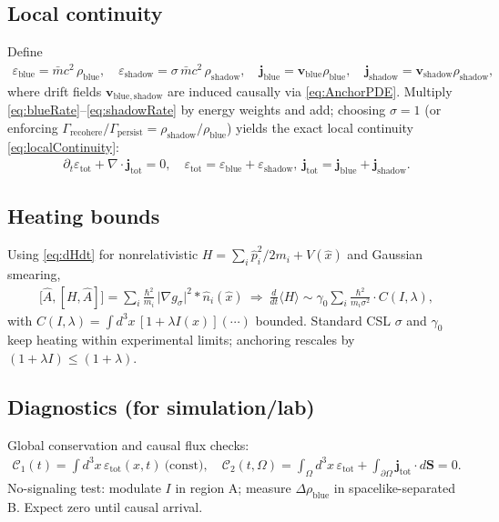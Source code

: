 \documentclass[11pt]{article}
\newcommand{\braket}[1]{\langle #1 \rangle}
\begin{document}
\subsection{Local continuity}
Define
\begin{align}
\varepsilon_{\mathrm{blue}}=\bar m c^2\,\rho_{\mathrm{blue}},\quad \varepsilon_{\mathrm{shadow}}=\sigma\,\bar m c^2\,\rho_{\mathrm{shadow}},\quad
\mathbf j_{\mathrm{blue}}=\mathbf v_{\mathrm{blue}}\rho_{\mathrm{blue}},\quad \mathbf j_{\mathrm{shadow}}=\mathbf v_{\mathrm{shadow}}\rho_{\mathrm{shadow}},
\end{align}
where drift fields $\mathbf v_{\mathrm{blue,shadow}}$ are induced causally via \eqref{eq:AnchorPDE}. Multiply \eqref{eq:blueRate}--\eqref{eq:shadowRate} by energy weights and add; choosing $\sigma=1$ (or enforcing $\Gamma_{\mathrm{recohere}}/\Gamma_{\mathrm{persist}}=\rho_{\mathrm{shadow}}/\rho_{\mathrm{blue}}$) yields the exact local continuity \eqref{eq:localContinuity}:
\begin{align}
\partial_t\varepsilon_{\mathrm{tot}}+\nabla\cdot\mathbf j_{\mathrm{tot}}=0,\quad
\varepsilon_{\mathrm{tot}}=\varepsilon_{\mathrm{blue}}+\varepsilon_{\mathrm{shadow}},\ \mathbf j_{\mathrm{tot}}=\mathbf j_{\mathrm{blue}}+\mathbf j_{\mathrm{shadow}}.\label{eq:ContFinal}
\end{align}

\subsection{Heating bounds}
Using \eqref{eq:dHdt} for nonrelativistic $H=\sum_i \hat p_i^2/2m_i+V(\hat x)$ and Gaussian smearing,
\begin{align}
\big[\hat A,[H,\hat A]\big]=\sum_i\frac{\hbar^2}{m_i}\,\big|\nabla g_\sigma\big|^2 * \hat n_i(\hat x)\ \Rightarrow\
\frac{d}{dt}\braket{H}\sim \gamma_0\sum_i\frac{\hbar^2}{m_i\sigma^2}\cdot C(I,\lambda),
\end{align}
with $C(I,\lambda)=\int d^3x\,[1+\lambda I(x)](\cdots)$ bounded. Standard CSL $\sigma$ and $\gamma_0$ keep heating within experimental limits; anchoring rescales by $(1+\lambda I)\le (1+\lambda)$.

\subsection{Diagnostics (for simulation/lab)}
Global conservation and causal flux checks:
\begin{align}
\mathcal C_1(t)=\int d^3x\,\varepsilon_{\mathrm{tot}}(x,t)\ \text{(const)},\quad
\mathcal C_2(t,\Omega)=\int_\Omega d^3x\,\varepsilon_{\mathrm{tot}}+\int_{\partial\Omega}\mathbf j_{\mathrm{tot}}\cdot d\mathbf S=0.
\end{align}
No-signaling test: modulate $I$ in region A; measure $\Delta\rho_{\mathrm{blue}}$ in spacelike-separated B. Expect zero until causal arrival.
\end{document}

